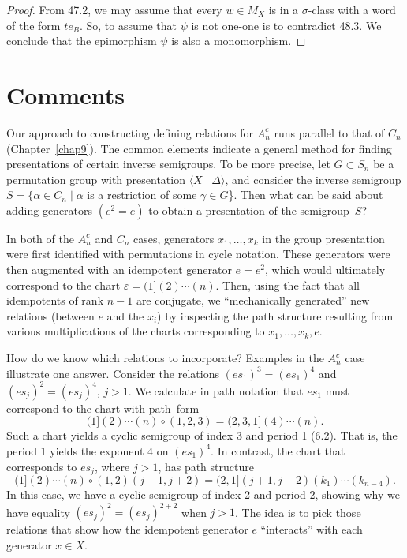 \documentclass{surv-l}
\numberwithin{equation}{section}
\numberwithin{table}{section}
\numberwithin{figure}{section}
\theoremstyle{definition}
\begin{document}
\begin{proof} From 47.2, we may assume that every $w\in M_{X}$ is in a
$\sigma$-class with a word of the form $te_{B}$. So, to assume
that $\psi$ is not one-one is to contradict 48.3. We conclude
that the epimorphism $\psi$ is also a monomorphism.
\end{proof}

\section{Comments}\label{sec10.49}

Our approach to constructing defining relations for $A_{n}^{c}$
runs parallel to that of $C_{n}$ (Chapter~\ref{chap9}). The common
elements indicate a general method for finding presentations of
certain inverse semigroups. To be more precise, let $G\subset
S_{n}$ be a permutation group with presentation $\langle X \mid
\Delta\rangle$, and consider the inverse semigroup
$S=\{\alpha\in C_{n}\mid \alpha$ is a restriction of some
$\gamma\in G$\}. Then what can be said about adding generators
$(e^{2}=e)$ to obtain a presentation of the semigroup~$S$?

In both of the $A_{n}^{c}$ and $C_{n}$ cases, generators
$x_{1},\ldots, x_{k}$ in the group presentation were first
identified with permutations in cycle notation. These generators
were then augmented with an idempotent generator $e=e^{2}$, which
would ultimately correspond to the chart $\varepsilon
=(1](2)\cdots(n)$. Then, using the fact that all idempotents of
rank $n-1$ are conjugate, we ``mechanically generated'' new
relations (between $e$ and the $x_{i}$) by inspecting the path
structure resulting from various multiplications of the charts
corresponding to $x_{1},\ldots, x_{k}, e$.

How do we know which relations to incorporate? Examples in the
$A_{n}^{c}$ case illustrate one answer. Consider the relations
$(es_{1})^{3}=(es_{1})^{4}$ and $(es_{j})^{2}= (es_{j})^{4}$, $j>1$.
We calculate in path notation that $es_{1}$ must correspond to the
chart with path~form
\[
(1](2)\cdots (n)\circ(1,2,3)=(2,3,1](4)\cdots(n).
\]
Such a chart yields a cyclic semigroup of index 3 and period 1
(6.2). That is, the period 1 yields the exponent 4 on
$(es_{1})^{4}$. In contrast, the chart that corresponds to
$es_{j}$, where $j>1$, has path structure
\[
(1] (2)\cdots (n) \circ (1,2)(j+1, j+2)=(2,1](j+1,
j+2)(k_{1})\cdots(k_{n-4}).
\]
In this case, we have a cyclic semigroup of index 2 and period 2,
showing why we have equality $(es_{j})^{2}=(es_{j})^{2+2}$ when
$j>1$. The idea is to pick those relations that show how the
idempotent generator $e$ ``interacts'' with each generator $x\in X$.
\end{document}
